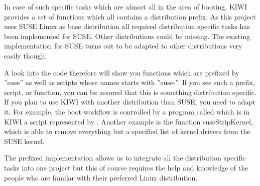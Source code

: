 In case of such specific tasks which are almost all in the area
of booting, KIWI provides a set of functions which all contains
a distribution prefix. As this project uses SUSE Linux as
base distribution all required distribution specific tasks has been
implemented for SUSE. Other distributions could be missing.
The existing implementation for SUSE turns out to be adapted to other
distributions very easily though.

A look into the code therefore will show you functions which are
prefixed by ''suse'' as well as scripts whose names starts with
''suse-''. If you see such a prefix, script, or function,
you can be assured that this is something distribution specific.
If you plan to use KIWI with another distribution than SUSE, you
need to adapt it. For example, the boot workflow is controlled
by a program called  which is in KIWI a script represented
by . Another example is the function 
suseStripKernel, which is able to remove everything but a specified
list of kernel drivers from the SUSE kernel.

The prefixed implementation allows us to integrate all the
distribution specific tasks into one project but this of course
requires the help and knowledge of the people who are familar
with their preferred Linux distribution. 

